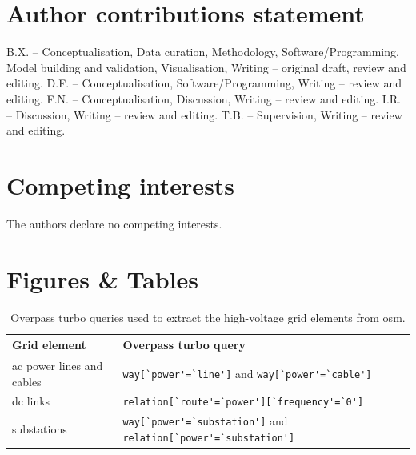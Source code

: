 \documentclass[fleqn,10pt]{wlscirep}
\newcommand{\colorcode}[1]{\colorbox{gray!20}{\lstinline|#1|}}
\begin{document}
\section*{Author contributions statement}
B.X. -- Conceptualisation, Data curation, Methodology, Software/Programming, Model building and validation, Visualisation, Writing -- original draft, review and editing. 
D.F. -- Conceptualisation, Software/Programming, Writing -- review and editing.
F.N. -- Conceptualisation, Discussion, Writing -- review and editing.
I.R. -- Discussion, Writing -- review and editing.
T.B. -- Supervision, Writing -- review and editing.

\section*{Competing interests} %
The authors declare no competing interests.

\newpage
\section*{Figures \& Tables}

\begin{table}[!htbp]
    \centering
    \begin{tabular}{|p{}|p{}|}
    \hline
    \textbf{Grid element} & \textbf{Overpass turbo query}  \\
    \hline
    \acrshort{ac} power lines and cables & \colorcode{way[`power'=`line']} and \colorcode{way[`power'=`cable']} \\
    \hline
    \acrshort{dc} links & \colorcode{relation[`route'=`power'][`frequency'=`0']} \\
    \hline
    substations & \colorcode{way[`power'=`substation']} and \colorcode{relation[`power'=`substation']} \\
    \hline
    \end{tabular}
    \caption{Overpass turbo queries used to extract the high-voltage grid elements from \acrshort{osm}.}
    \label{tab:overpass_queries}
\end{table}
\end{document}

